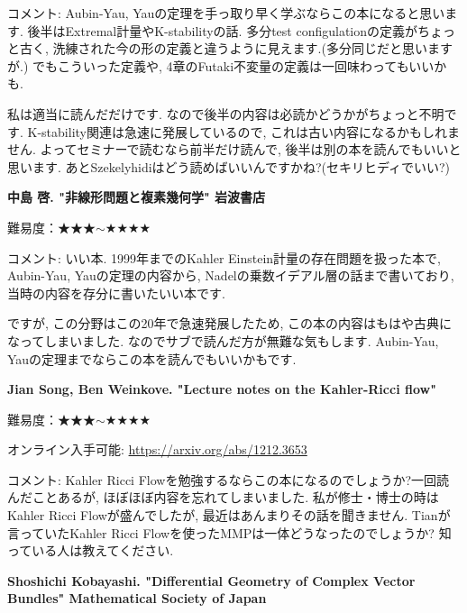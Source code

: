 コメント: Aubin-Yau, Yauの定理を手っ取り早く学ぶならこの本になると思います. 後半はExtremal計量やK-stabilityの話. 多分test configulationの定義がちょっと古く, 洗練された今の形の定義と違うように見えます.(多分同じだと思いますが.) でもこういった定義や, 4章のFutaki不変量の定義は一回味わってもいいかも. 

私は適当に読んだだけです. なので後半の内容は必読かどうかがちょっと不明です. K-stability関連は急速に発展しているので, これは古い内容になるかもしれません. 
よってセミナーで読むなら前半だけ読んで, 後半は別の本を読んでもいいと思います. 
あとSzekelyhidiはどう読めばいいんですかね?(セキリヒディでいい?)
\vspace{8pt}

\textbf{中島 啓. "非線形問題と複素幾何学" 岩波書店}  \vspace{-6pt} 

難易度：★★★$\sim$★★★★ \vspace{-6pt} 

コメント: いい本. 1999年までのKahler Einstein計量の存在問題を扱った本で, Aubin-Yau, Yauの定理の内容から, Nadelの乗数イデアル層の話まで書いており, 当時の内容を存分に書いたいい本です.

ですが, この分野はこの20年で急速発展したため, この本の内容はもはや古典になってしまいました. 
なのでサブで読んだ方が無難な気もします. Aubin-Yau, Yauの定理までならこの本を読んでもいいかもです.
\vspace{8pt}

\textbf{Jian Song, Ben Weinkove. "Lecture notes on the Kahler-Ricci flow"}  \vspace{-6pt} 

難易度：★★★$\sim$★★★★ \vspace{-6pt} 

オンライン入手可能: \url{https://arxiv.org/abs/1212.3653}\vspace{-6pt}

コメント: Kahler Ricci Flowを勉強するならこの本になるのでしょうか?一回読んだことあるが, ほぼほぼ内容を忘れてしまいました. 私が修士・博士の時はKahler Ricci Flowが盛んでしたが, 最近はあんまりその話を聞きません. Tianが言っていたKahler Ricci Flowを使ったMMPは一体どうなったのでしょうか? 知っている人は教えてください. 
\vspace{8pt}

\textbf{Shoshichi Kobayashi. "Differential Geometry of Complex Vector Bundles"  Mathematical Society of Japan}  \vspace{-6pt} 

